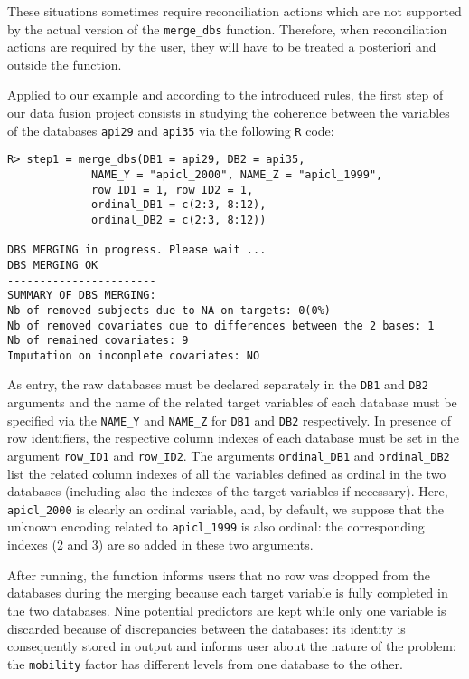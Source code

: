 These situations sometimes require reconciliation actions which are not supported by the actual version of the \texttt{merge\_dbs} function. Therefore, when reconciliation actions are required by the user, they will have to be treated a posteriori and outside the function.

Applied to our example and according to the introduced rules, the first step of our data fusion project consists in studying the coherence between the variables of the databases \texttt{api29} and \texttt{api35} via the following \texttt{R} code:

\begin{verbatim}
R> step1 = merge_dbs(DB1 = api29, DB2 = api35,
             NAME_Y = "apicl_2000", NAME_Z = "apicl_1999",
             row_ID1 = 1, row_ID2 = 1,  
             ordinal_DB1 = c(2:3, 8:12), 
             ordinal_DB2 = c(2:3, 8:12))

DBS MERGING in progress. Please wait ...
DBS MERGING OK
-----------------------
SUMMARY OF DBS MERGING:
Nb of removed subjects due to NA on targets: 0(0%)
Nb of removed covariates due to differences between the 2 bases: 1
Nb of remained covariates: 9
Imputation on incomplete covariates: NO
\end{verbatim}

As entry, the raw databases must be declared separately in the \texttt{DB1} and \texttt{DB2} arguments and the name of
the related target variables of each database must be specified via the \texttt{NAME\_Y} and \texttt{NAME\_Z} for \texttt{DB1} and \texttt{DB2} respectively. In presence of row identifiers, the respective column indexes of each database must be set in the argument \texttt{row\_ID1} and \texttt{row\_ID2}. The arguments \texttt{ordinal\_DB1} and \texttt{ordinal\_DB2} list the related
column indexes of all the variables defined as ordinal in the two databases (including also the indexes of the
target variables if necessary). Here, \texttt{apicl\_2000} is clearly an ordinal variable, and, by default, we suppose
that the unknown encoding related to \texttt{apicl\_1999} is also ordinal: the corresponding indexes (2 and 3) are so
added in these two arguments.

After running, the function informs users that no row was dropped from the databases during the merging
because each target variable is fully completed in the two databases. Nine potential predictors are kept while
only one variable is discarded because of discrepancies between the databases: its identity is consequently stored in output and informs user about the nature of the problem: the \texttt{mobility} factor has different levels from one database to the other.

